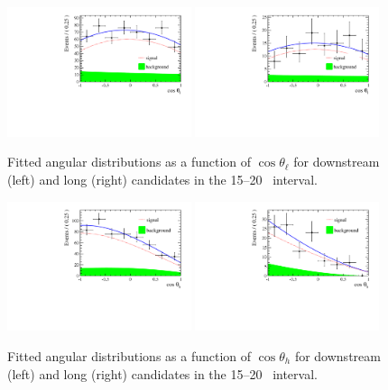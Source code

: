 \begin{figure}[t]
\centering
\includegraphics[width=0.48\textwidth]{Lmumu/figs/AngularDistribs/Fitted/Afb_DD_q2_1500_2000.pdf}
\includegraphics[width=0.48\textwidth]{Lmumu/figs/AngularDistribs/Fitted/Afb_LL_q2_1500_2000.pdf}
\caption{Fitted angular distributions as a function of $\cos\theta_\ell$ for downstream
 (left) and long (right) candidates in the 15--20 \gevgevcccc ~\qsq interval.  }
\label{fig:AngFit}
\end{figure}
%
\begin{figure}[h]
\centering
\includegraphics[width=0.48\textwidth]{Lmumu/figs/AngularDistribs/Fitted/AfbB_DD_q2_1500_2000.pdf}
\includegraphics[width=0.48\textwidth]{Lmumu/figs/AngularDistribs/Fitted/AfbB_LL_q2_1500_2000.pdf}
\caption{Fitted angular distributions as a function of $\cos\theta_h$ for downstream
 (left) and long (right) candidates in the 15--20 \gevgevcccc ~\qsq interval.  }
 \label{fig:AngFitB}
\end{figure}
